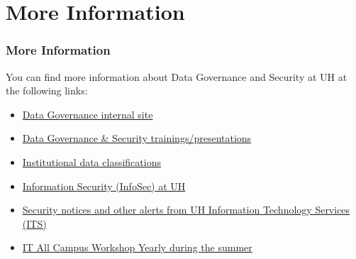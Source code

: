 \section*{More Information}
\begin{frame}
  \frametitle{More Information}
  You can find more information about Data Governance and Security at UH at the following links:
  \begin{itemize}
  \item \href{https://datagov.intranet.hawaii.edu/}{Data Governance internal site}
  \item \href{https://datagov.intranet.hawaii.edu/training/}{Data Governance \& Security trainings/presentations}
  \item \href{https://datagov.intranet.hawaii.edu/institutional-data-classification-levels/}{Institutional data classifications}
  \item \href{https://www.hawaii.edu/infosec/}{Information Security (InfoSec) at UH}
  \item \href{https://www.hawaii.edu/its/alerts/}{Security notices and other alerts from UH Information Technology Services (ITS)}
  \item \href{https://www.hawaii.edu/its/itacw/}{IT All Campus Workshop \ddash Yearly during the summer}
  \end{itemize}
\end{frame}  







